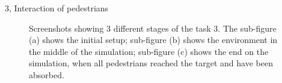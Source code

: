 \documentclass[10pt,a4paper]{article}
\begin{document}
\begin{task}{3, Interaction of pedestrians}
\begin{figure}[H]
    \centering
    \hfill
    \hfill
    \caption{Screenshots showing 3 different stages of the task 3. The sub-figure (a) shows the initial setup; sub-figure (b) shows the environment in the middle of the simulation; sub-figure (c) shows the end on the simulation, when all pedestrians reached the target and have been absorbed.}
    \label{fig:task3}
\end{figure}
\end{task}
\end{document}
